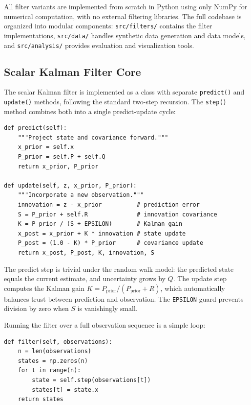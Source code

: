 \documentclass[11pt, a4paper]{article}
\begin{document}
All filter variants are implemented from scratch in Python using only NumPy for numerical computation, with no external filtering libraries. The full codebase is organized into modular components: \texttt{src/filters/} contains the filter implementations, \texttt{src/data/} handles synthetic data generation and data models, and \texttt{src/analysis/} provides evaluation and visualization tools.

\subsection{Scalar Kalman Filter Core}

The scalar Kalman filter is implemented as a class with separate \texttt{predict()} and \texttt{update()} methods, following the standard two-step recursion. The \texttt{step()} method combines both into a single predict-update cycle:

\begin{lstlisting}[style=python, caption={Core predict-update cycle of the scalar Kalman filter (\texttt{scalar\_kalman.py}).}]
def predict(self):
    """Project state and covariance forward."""
    x_prior = self.x
    P_prior = self.P + self.Q
    return x_prior, P_prior

def update(self, z, x_prior, P_prior):
    """Incorporate a new observation."""
    innovation = z - x_prior          # prediction error
    S = P_prior + self.R              # innovation covariance
    K = P_prior / (S + EPSILON)       # Kalman gain
    x_post = x_prior + K * innovation # state update
    P_post = (1.0 - K) * P_prior      # covariance update
    return x_post, P_post, K, innovation, S
\end{lstlisting}

The predict step is trivial under the random walk model: the predicted state equals the current estimate, and uncertainty grows by $Q$. The update step computes the Kalman gain $K = P_{\text{prior}} / (P_{\text{prior}} + R)$, which automatically balances trust between prediction and observation. The \texttt{EPSILON} guard prevents division by zero when $S$ is vanishingly small.

Running the filter over a full observation sequence is a simple loop:

\begin{lstlisting}[style=python, caption={Batch filtering over an observation sequence.}]
def filter(self, observations):
    n = len(observations)
    states = np.zeros(n)
    for t in range(n):
        state = self.step(observations[t])
        states[t] = state.x
    return states
\end{lstlisting}
\end{document}
